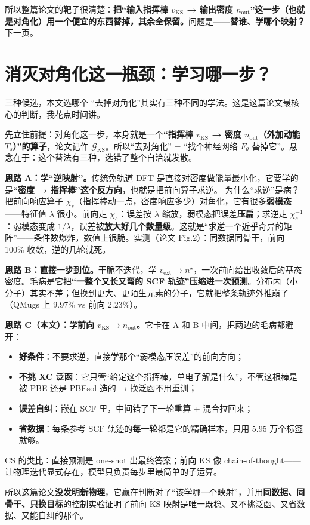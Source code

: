 \documentclass[11pt, a4paper, fontset=none]{ctexart}
\newcommand{\hl}[1]{{\color{key}\bfseries #1}}
\begin{document}
\begin{say}[title={一句话收（过渡到下一页）}]
所以整篇论文的靶子很清楚：\textbf{把“输入指挥棒 $v_{\text{KS}}$ → 输出密度 $n_{\text{out}}$”这一步（也就是对角化）用一个便宜的东西替掉，其余全保留。}问题是——\hl{替谁、学哪个映射？}下一页。
\end{say}

\section{消灭对角化这一瓶颈：学习哪一步？}\label{sec:s4}

\begin{say}{三种候选，本文选哪个}
“去掉对角化”其实有三种不同的学法。这是这篇论文最核心的判断，我花点时间讲。

先立住前提：对角化这一步，本身就是一个\textbf{“指挥棒 $v_{\text{KS}}$ → 密度 $n_{\text{out}}$（外加动能 $T_s$）”的算子}，论文记作 $\mathcal G_{\text{KS}}$。所以“去对角化” = “找个神经网络 $F_\theta$ 替掉它”。悬念在于：这个替法有三种，选错了整个自洽就发散。

\textbf{思路 A：学“逆映射”。}传统免轨道 DFT 是直接对密度做能量最小化，它要学的是\hl{“密度 → 指挥棒”这个反方向}，也就是把前向算子求逆。
为什么“求逆”是病？把前向响应算子 $\chi_s$（指挥棒动一点，密度响应多少）对角化，它有很多\textbf{弱模态}——特征值 $\lambda$ 很小。前向走 $\chi_s$：误差按 $\lambda$ 缩放，弱模态把误差\hl{压扁}；求逆走 $\chi_s^{-1}$：弱模态变成 $1/\lambda$，误差被\hl{放大好几个数量级}。这就是“求逆一个近乎奇异的矩阵”——条件数爆炸，数值上很脆。实测（论文 Fig.2）：同数据同骨干，前向 100\% 收敛，逆的几轮就死。

\textbf{思路 B：直接一步到位。}干脆不迭代，学 $v_{\text{ext}} \to n^\star$，一次前向给出收敛后的基态密度。毛病是它把\hl{“一整个又长又弯的 SCF 轨迹”压缩进一次预测}。分布内（小分子）其实不差；但换到更大、更陌生元素的分子，它就把整条轨迹外推崩了（QMugs 上 9.97\% vs 前向 2.23\%）。

\textbf{思路 C（本文）：学前向 $v_{\text{KS}} \to n_{\text{out}}$。}它卡在 A 和 B 中间，把两边的毛病都避开：
\begin{itemize}[leftmargin=*]
  \item \hl{好条件}：不要求逆，直接学那个“弱模态压误差”的前向方向；
  \item \hl{不挑 XC 泛函}：它只管“给定这个指挥棒，单电子解是什么”，不管这根棒是被 PBE 还是 PBEsol 造的 → 换泛函不用重训；
  \item \hl{误差自纠}：嵌在 SCF 里，中间错了下一轮重算 + 混合拉回来；
  \item \hl{省数据}：每条参考 SCF 轨迹的\textbf{每一轮}都是它的精确样本，只用 5.95 万个标签就够。
\end{itemize}
CS 的类比：直接预测是 one-shot 出最终答案；前向 KS 像 chain-of-thought——让物理迭代显式存在，模型只负责每步里最简单的子运算。

所以这篇论文\hl{没发明新物理}，它赢在判断对了“该学哪一个映射”，并用\textbf{同数据、同骨干、只换目标}的控制实验证明了前向 KS 映射是唯一既稳、又不挑泛函、又省数据、又能自纠的那个。
\end{say}
\end{document}
